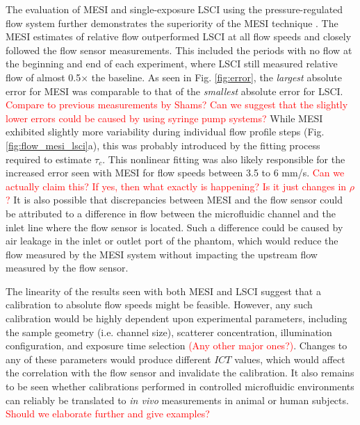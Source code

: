 \documentclass[12pt]{spieman}
\begin{document}
\begin{spacing}{2}
The evaluation of MESI and single-exposure LSCI using the pressure-regulated flow system further demonstrates the superiority of the MESI technique \cite{Kazmi:2013hp}. The MESI estimates of relative flow outperformed LSCI at all flow speeds and closely followed the flow sensor measurements. This included the periods with no flow at the beginning and end of each experiment, where LSCI still measured relative flow of almost 0.5$\times$ the baseline. As seen in Fig. \ref{fig:error}, the \textit{largest} absolute error for MESI was comparable to that of the \textit{smallest} absolute error for LSCI. \textcolor{red}{Compare to previous measurements by Shams? Can we suggest that the slightly lower errors could be caused by using syringe pump systems?} While MESI exhibited slightly more variability during individual flow profile steps (Fig. \ref{fig:flow_mesi_lsci}a), this was probably introduced by the fitting process required to estimate $\tau_c$. This nonlinear fitting was also likely responsible for the increased error seen with MESI for flow speeds between 3.5 to 6 mm/s. \textcolor{red}{Can we actually claim this? If yes, then what exactly is happening? Is it just changes in $\rho$?} It is also possible that discrepancies between MESI and the flow sensor could be attributed to a difference in flow between the microfluidic channel and the inlet line where the flow sensor is located. Such a difference could be caused by air leakage in the inlet or outlet port of the phantom, which would reduce the flow measured by the MESI system without impacting the upstream flow measured by the flow sensor.

The linearity of the results seen with both MESI and LSCI suggest that a calibration to absolute flow speeds might be feasible. However, any such calibration would be highly dependent upon experimental parameters, including the sample geometry (i.e. channel size), scatterer concentration, illumination configuration, and exposure time selection \textcolor{red}{(Any other major ones?)}. Changes to any of these parameters would produce different $ICT$ values, which would affect the correlation with the flow sensor and invalidate the calibration. It also remains to be seen whether calibrations performed in controlled microfluidic environments can reliably be translated to \textit{in vivo} measurements in animal or human subjects. \textcolor{red}{Should we elaborate further and give examples?}


\end{spacing}
\end{document}
